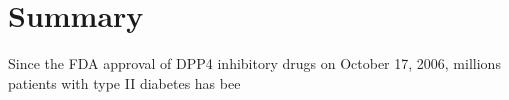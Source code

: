 \section{\label{chap:Sum} Summary}
Since the FDA approval of DPP4 inhibitory drugs on October 17, 2006, millions patients with type II diabetes has bee
